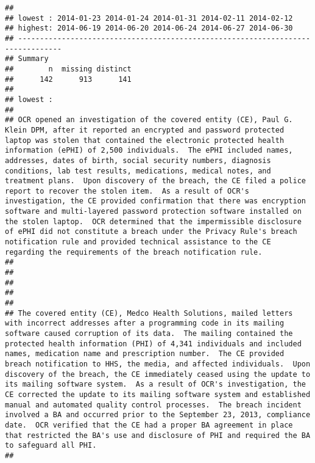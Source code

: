 \documentclass[
]{article}
\begin{document}
\begin{verbatim}
## 
## lowest : 2014-01-23 2014-01-24 2014-01-31 2014-02-11 2014-02-12
## highest: 2014-06-19 2014-06-20 2014-06-24 2014-06-27 2014-06-30
## --------------------------------------------------------------------------------
## Summary 
##        n  missing distinct 
##      142      913      141 
## 
## lowest : 
## 
## OCR opened an investigation of the covered entity (CE), Paul G. Klein DPM, after it reported an encrypted and password protected laptop was stolen that contained the electronic protected health information (ePHI) of 2,500 individuals.  The ePHI included names, addresses, dates of birth, social security numbers, diagnosis conditions, lab test results, medications, medical notes, and treatment plans.  Upon discovery of the breach, the CE filed a police report to recover the stolen item.  As a result of OCR's investigation, the CE provided confirmation that there was encryption software and multi-layered password protection software installed on the stolen laptop.  OCR determined that the impermissible disclosure of ePHI did not constitute a breach under the Privacy Rule's breach notification rule and provided technical assistance to the CE regarding the requirements of the breach notification rule.
## 
## 
## 
##                                                                                                                                                                                                                                           
## 
## The covered entity (CE), Medco Health Solutions, mailed letters with incorrect addresses after a programming code in its mailing software caused corruption of its data.  The mailing contained the protected health information (PHI) of 4,341 individuals and included names, medication name and prescription number.  The CE provided breach notification to HHS, the media, and affected individuals.  Upon discovery of the breach, the CE immediately ceased using the update to its mailing software system.  As a result of OCR's investigation, the CE corrected the update to its mailing software system and established manual and automated quality control processes.  The breach incident involved a BA and occurred prior to the September 23, 2013, compliance date.  OCR verified that the CE had a proper BA agreement in place that restricted the BA's use and disclosure of PHI and required the BA to safeguard all PHI.
## 

\end{verbatim}
\end{document}
